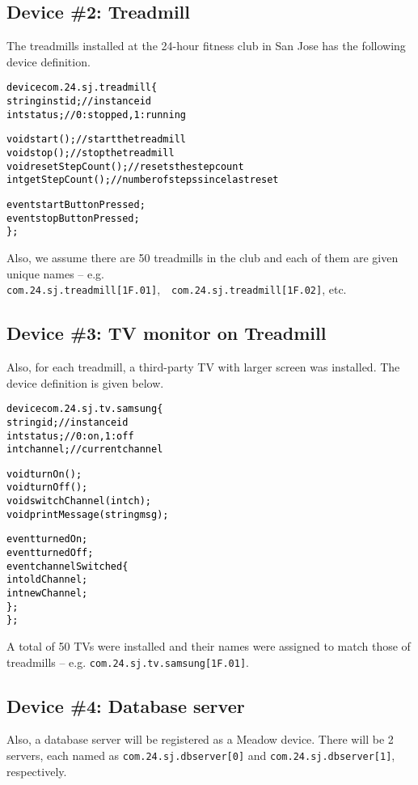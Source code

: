 \documentclass{note}
\begin{document}
\subsection{Device \#2: Treadmill}
The treadmills installed at the 24-hour fitness club in San Jose has the
following device definition.
\begin{alltt}
  \textcolor{black}{device com.24.sj.treadmill \{
    string instid;            // instance id
    int status;               // 0: stopped, 1: running

    void start();             // start the treadmill
    void stop();              // stop the treadmill
    void resetStepCount();    // resets the step count
    int getStepCount();       // number of steps since last reset

    event startButtonPressed;
    event stopButtonPressed;
  \};}
\end{alltt}
Also, we assume there are 50 treadmills in the club and each of them are given
unique names -- e.g. \verb+com.24.sj.treadmill[1F.01]+,\ \ 
\verb+com.24.sj.treadmill[1F.02]+, etc.

\subsection{Device \#3: TV monitor on Treadmill}
Also, for each treadmill, a third-party TV with larger screen was installed.
The device definition is given below.
\begin{alltt}
  \textcolor{black}{device com.24.sj.tv.samsung \{
    string id;                // instance id
    int status;               // 0: on, 1: off
    int channel;              // current channel

    void turnOn();
    void turnOff();
    void switchChannel(int ch);
    void printMessage(string msg);

    event turnedOn;
    event turnedOff;
    event channelSwitched \{
      int oldChannel;
      int newChannel;
    \};
  \};}
\end{alltt}
A total of 50 TVs were installed and their names were assigned to match those
of treadmills -- e.g. \verb+com.24.sj.tv.samsung[1F.01]+.

\subsection{Device \#4: Database server}
Also, a database server will be registered as a Meadow device. There will be 2
servers, each named as \verb+com.24.sj.dbserver[0]+ and
\verb+com.24.sj.dbserver[1]+, respectively. 
\end{document}
